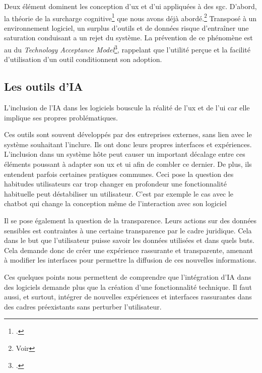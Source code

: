 Deux élément dominent les conception d'\gls{ux} et d'\gls{ui} appliquées à des \gls{sgc}. D'abord, la théorie de la surcharge cognitive\footcite{paasCognitiveLoadTheory2010} que nous avons déjà abordé.\footnote{Voir } Transposé à un environnement logiciel, un surplus d'outils et de données risque d'entraîner une saturation conduisant a un rejet du système. La prévention de ce phénomène est au \coeur du \textit{Technology Acceptance Model}\footcite{baddaTechnologyAcceptanceModel2025}, rappelant que l'utilité perçue et la facilité d'utilisation d'un outil conditionnent son adoption.

\subsection{Les outils d'\gls{IA}}

L'inclusion de l'\gls{IA} dans les logiciels bouscule la réalité de l'\gls{ux} et de l'\gls{ui} car elle implique ses propres problématiques.

Ces outils sont souvent développés par des entreprises externes, sans lien avec le système souhaitant l'inclure. Ils ont donc leurs propres interfaces et expériences. L'inclusion dans un système hôte peut causer un important décalage entre ces éléments poussant à adapter son \gls{ux} et \gls{ui} afin de combler ce dernier. De plus, ils entendent parfois  certaines pratiques communes. Ceci pose la question des habitudes utilisateurs car trop changer en profondeur une fonctionnalité habituelle peut déstabiliser un utilisateur. C'est par exemple le cas avec le \gls{chatbot} qui change la conception même de l'interaction avec son logiciel

Il se pose également la question de la transparence. Leurs actions sur des données sensibles est contraintes à une certaine transparence par le cadre juridique. Cela dans le but que l'utilisateur puisse savoir les données utilisées et dans quels buts. Cela demande donc de créer une expérience rassurante et transparente, amenant à modifier les interfaces pour permettre la diffusion de ces nouvelles informations.\newline

Ces quelques points nous permettent de comprendre que l'intégration d'\gls{IA} dans des logiciels demande plus que la création d'une fonctionnalité technique. Il faut aussi, et surtout, intégrer de nouvelles expériences et interfaces rassurantes dans des cadres préexistants sans perturber l'utilisateur.

